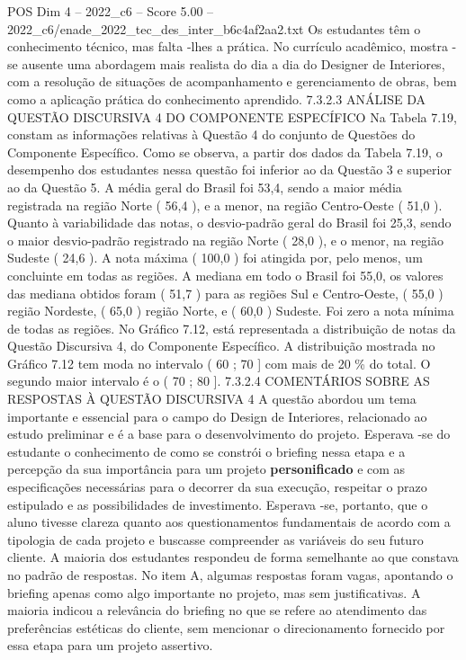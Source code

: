 \begin{textsample}{POS Dim 4 – 2022\_c6 – Score 5.00 – 2022\_c6/enade\_2022\_tec\_des\_inter\_b6c4af2aa2.txt}
Os estudantes têm o conhecimento técnico, mas falta -lhes a prática.
No currículo acadêmico, mostra -se ausente uma abordagem mais realista do dia a dia do Designer de Interiores, com a resolução de situações de acompanhamento e gerenciamento de obras, bem como a aplicação prática do conhecimento aprendido. 7.3.2.3 ANÁLISE DA QUESTÃO DISCURSIVA 4 DO COMPONENTE ESPECÍFICO Na Tabela 7.19, constam as informações relativas à Questão 4 do conjunto de Questões do Componente Específico.
Como se observa, a partir dos dados da Tabela 7.19, o desempenho dos estudantes nessa questão foi inferior ao da Questão 3 e superior ao da Questão 5.
A média geral do Brasil foi 53,4, sendo a maior média registrada na região Norte ( 56,4 ), e a menor, na região Centro-Oeste ( 51,0 ).
Quanto à variabilidade das notas, o desvio-padrão geral do Brasil foi 25,3, sendo o maior desvio-padrão registrado na região Norte ( 28,0 ), e o menor, na região Sudeste ( 24,6 ).
A nota máxima ( 100,0 ) foi atingida por, pelo menos, um concluinte em todas as regiões.
A mediana em todo o Brasil foi 55,0, os valores das mediana obtidos foram ( 51,7 ) para as regiões Sul e Centro-Oeste, ( 55,0 ) região Nordeste, ( 65,0 ) região Norte, e ( 60,0 ) Sudeste.
Foi zero a nota mínima de todas as regiões.
No Gráfico 7.12, está representada a distribuição de notas da Questão Discursiva 4, do Componente Específico.
A distribuição mostrada no Gráfico 7.12 tem moda no intervalo ( 60 ; 70 ] com mais de 20 \% do total.
O segundo maior intervalo é o ( 70 ; 80 ]. 7.3.2.4 COMENTÁRIOS SOBRE AS RESPOSTAS À QUESTÃO DISCURSIVA 4 A questão abordou um tema importante e essencial para o campo do Design de Interiores, relacionado ao estudo preliminar e é a base para o desenvolvimento do projeto.
Esperava -se do estudante o conhecimento de como se constrói o briefing nessa etapa e a percepção da sua importância para um projeto \textbf{personificado} e com as especificações necessárias para o decorrer da sua execução, respeitar o prazo estipulado e as possibilidades de investimento.
Esperava -se, portanto, que o aluno tivesse clareza quanto aos questionamentos fundamentais de acordo com a tipologia de cada projeto e buscasse compreender as variáveis do seu futuro cliente.
A maioria dos estudantes respondeu de forma semelhante ao que constava no padrão de respostas.
No item A, algumas respostas foram vagas, apontando o briefing apenas como algo importante no projeto, mas sem justificativas.
A maioria indicou a relevância do briefing no que se refere ao atendimento das preferências estéticas do cliente, sem mencionar o direcionamento fornecido por essa etapa para um projeto assertivo.

\end{textsample}
